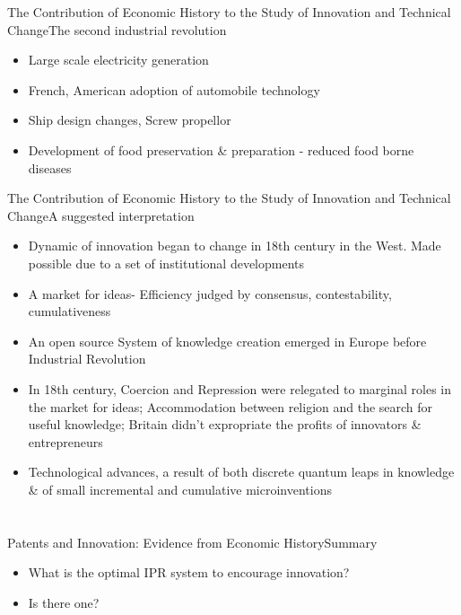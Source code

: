 \documentclass{beamer}
\begin{document}
\begin{frame}{The Contribution of Economic History to the Study of Innovation and Technical Change}{The second industrial revolution}
\begin{itemize}
\item{Large scale electricity generation}
\item{French, American adoption of automobile technology}
\item{Ship design changes, Screw propellor}
\item{Development of food preservation \& preparation - reduced food borne diseases}
\end{itemize}
\end{frame}

\begin{frame}{The Contribution of Economic History to the Study of Innovation and Technical Change}{A suggested interpretation}
\begin{itemize}
\item{Dynamic of innovation began to change in 18th century in the West. Made possible due to a set of institutional developments}
\item{A market for ideas- Efficiency judged by consensus, contestability, cumulativeness}
\item{An open source System of knowledge creation emerged in Europe before Industrial Revolution}
\item{In 18th century, Coercion and Repression were relegated to marginal roles in the market for ideas; Accommodation between religion and the search for useful knowledge; Britain didn't expropriate the profits of innovators \& entrepreneurs}
\item{Technological advances, a result of both discrete quantum leaps in knowledge \& of small incremental and cumulative microinventions}
\end{itemize}
\end{frame}


\section{\cite{Moser2013}}
\begin{frame}{Patents and Innovation: Evidence from Economic History}{Summary}
\begin{itemize}
\item{What is the optimal IPR system to encourage innovation?}
\item{Is there one?}
\end{itemize}
\end{frame}
\end{document}
